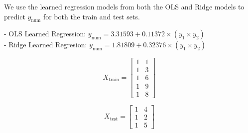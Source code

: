 \documentclass[12pt]{article}
\begin{document}
\begin{enumerate}[leftmargin=\labelsep, label=\textbf{\arabic*.)}]
\begin{itemize}
                    We use the learned regression models from both the OLS and Ridge models to predict \( y_{\text{num}} \) for both the train and test sets.

                    - OLS Learned Regression: \( y_{\text{num}} = 3.31593 + 0.11372 \times (y_1 \times y_2) \) \\
                    - Ridge Learned Regresion: \( y_{\text{num}} = 1.81809 + 0.32376 \times (y_1 \times y_2) \)

                    \[
                        X_{\text{train}} = \begin{bmatrix} 1 & 1 \\ 1 & 3 \\ 1 & 6 \\ 1 & 9 \\ 1 & 8 \end{bmatrix}
                    \]

                    \[
                        X_{\text{test}} = \begin{bmatrix} 1 & 4 \\ 1 & 2 \\ 1 & 5 \end{bmatrix}
                    \]


\end{itemize}
\end{enumerate}
\end{document}
